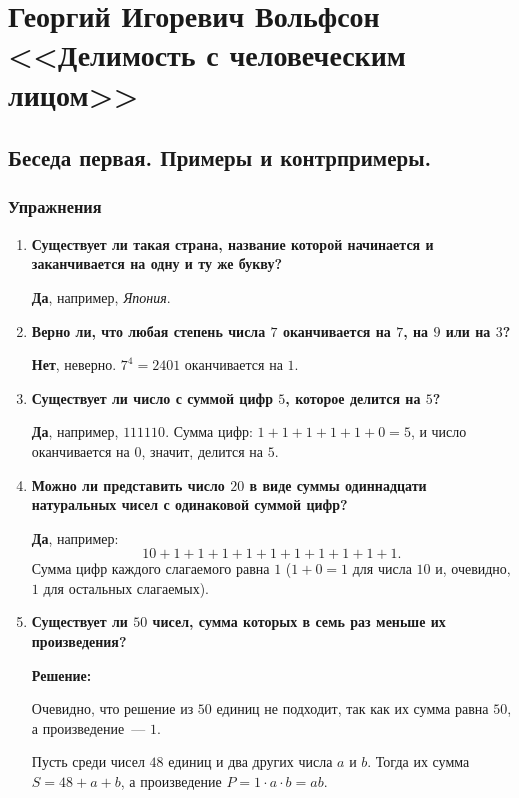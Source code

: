\documentclass[12pt, a4paper]{article}
\begin{document}
\section*{Георгий Игоревич Вольфсон <<Делимость с человеческим лицом>>}

\subsection*{Беседа первая. Примеры и контрпримеры.}

\subsubsection*{Упражнения}

\begin{enumerate}[label=\arabic*., wide=0pt, leftmargin=*]
    \item \textbf{Существует ли такая страна, название которой начинается и заканчивается на одну и ту же букву?}

    \textbf{Да}, например, \emph{Япония}.

    \item \textbf{Верно ли, что любая степень числа $7$ оканчивается на $7$, на $9$ или на $3$?}

    \textbf{Нет}, неверно. $7^4 = 2401$ оканчивается на $1$.

    \item \textbf{Существует ли число с суммой цифр $5$, которое делится на $5$?}

    \textbf{Да}, например, $111110$. Сумма цифр: $1+1+1+1+1+0=5$, и число оканчивается на $0$, значит, делится на $5$.

    \item \textbf{Можно ли представить число $20$ в виде суммы одиннадцати натуральных чисел с одинаковой суммой цифр?}

    \textbf{Да}, например:
    \[
    10 + 1 + 1 + 1 + 1 + 1 + 1 + 1 + 1 + 1 + 1.
    \]
    Сумма цифр каждого слагаемого равна $1$ ($1+0=1$ для числа $10$ и, очевидно, $1$ для остальных слагаемых).

    \item \textbf{Существует ли $50$ чисел, сумма которых в семь раз меньше их произведения?}

    \textbf{Решение:}

    Очевидно, что решение из $50$ единиц не подходит, так как их сумма равна $50$, а произведение~--- $1$.

    Пусть среди чисел $48$ единиц и два других числа $a$ и $b$. Тогда их сумма $S = 48 + a + b$, а произведение $P = 1 \cdot a \cdot b = ab$.


\end{enumerate}
\end{document}
